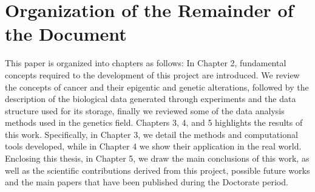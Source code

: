 \section{Organization of the Remainder of the Document}

This paper is organized into chapters as follows: In Chapter 2,
fundamental concepts required to the development of this project are introduced.
We review the concepts of cancer and their epigentic and genetic alterations,
followed by the description of the biological data generated through experiments and the data structure used for its storage,
finally we reviewed some of the data analysis methods used in the genetics field.
Chapters 3, 4, and 5 highlights the results of this work. Specifically, in Chapter 3,
we detail the methods and computational tools developed, while in Chapter 4 we
show their application in the real world. Enclosing this thesis, in Chapter 5,
we draw the main conclusions of this work, as well as the scientific contributions
derived from this project, possible future works and the main papers
that have been published during the Doctorate period.
